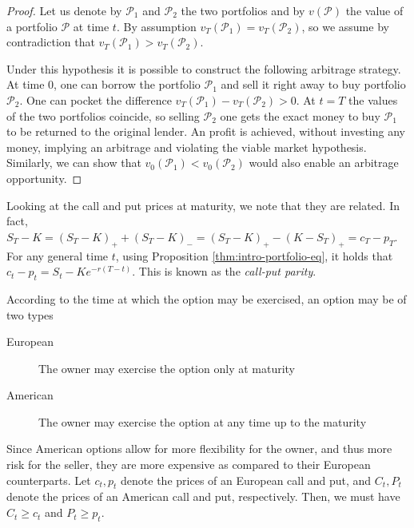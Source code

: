 \begin{proof}
	Let us denote by $ \mathcal{P}_1 $ and $ \mathcal{P}_2 $ the two portfolios and by $ v(\mathcal{P}) $ the value of a portfolio $ \mathcal{P} $ at time $ t $. By assumption $ v_T (\mathcal{P}_1) = v_T (\mathcal{P}_2) $, so we assume by contradiction that $ v_T (\mathcal{P}_1) > v_T (\mathcal{P}_2) $.
	
	Under this hypothesis it is possible to construct the following arbitrage strategy. At time 0, one can borrow the portfolio $ \mathcal{P}_1 $ and sell it right away to buy portfolio $ \mathcal{P}_2 $. One can pocket the difference $ v_T (\mathcal{P}_1) - v_T (\mathcal{P}_2) > 0 $. At $ t = T $ the values of the two portfolios coincide, so selling $ \mathcal{P}_2 $ one gets the exact money to buy $ \mathcal{P}_1 $ to be returned to the original lender. An profit is achieved, without investing any money, implying an arbitrage and violating the viable market hypothesis. Similarly, we can show that $ v_0 (\mathcal{P}_1) < v_0 (\mathcal{P}_2) $ would also enable an arbitrage opportunity.
\end{proof}


Looking at the call and put prices at maturity, we note that they are related. In fact, $ S_T - K = (S_T - K)_+ + (S_T - K)_- = (S_T - K)_+ - (K - S_T)_+ = c_T - p_T $. For any general time $ t $, using Proposition \ref{thm:intro-portfolio-eq}, it holds that $ c_t - p_t = S_t - K e^{- r (T-t) } $. This is known as the \emph{call-put parity}.

According to the time at which the option may be exercised, an option may be of two types
\begin{description}
	\item[European] The owner may exercise the option only at maturity
	\item[American] The owner may exercise the option at any time up to the maturity
\end{description}
Since American options allow for more flexibility for the owner, and thus more risk for the seller, they are more expensive as compared to their European counterparts. Let $ c_t, p_t $ denote the prices of an European call and put, and $ C_t, P_t $ denote the prices of an American call and put, respectively. Then, we must have $ C_t \ge c_t $ and $ P_t \ge p_t $.

